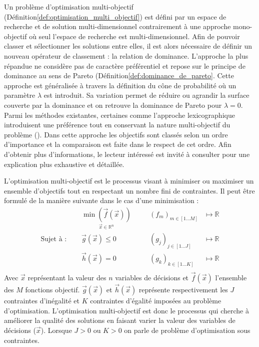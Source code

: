 Un problème d’optimisation multi-objectif (Définition\ref{def:optimisation_multi_objectif})
est défini par un espace de recherche et de solution multi-dimensionnel contrairement à
une approche mono-objectif où seul l’espace de recherche est multi-dimensionnel.
Afin de pouvoir classer et sélectionner les solutions entre elles, il est alors nécessaire
de définir un nouveau opérateur de classement : la relation de dominance.
L’approche la plus répandue ne considère pas de caractère préférentiel et repose sur
le principe de dominance au sens de Pareto (Définition\ref{def:dominance_de_pareto}.
Cette approche est généralisée à travers la définition du cône de probabilité où
un paramètre $\lambda$ est introduit. Sa variation permet de réduire ou agrandir
la surface couverte par la dominance et on retrouve la dominance de Pareto pour $\lambda = 0$.
Parmi les méthodes existantes, certaines comme l’approche lexicographique introduisent une
préférence tout en conservant la nature multi-objectif du problème (). Dans cette approche les objectifs sont classés selon un ordre d’importance et
la comparaison est faite dans le respect de cet ordre.
Afin d’obtenir plus d’informations, le lecteur intéressé est invité à consulter \cite{Collette2002}
pour une explication plus exhaustive et détaillée.

\begin{Def}\label{def:optimisation_multi_objectif}
L’optimisation multi-objectif est le processus visant à minimiser ou maximiser un ensemble
d’objectifs tout en respectant un nombre fini de contraintes.
Il peut être formulé de la manière suivante dans le cas d’une minimisation :
\begin{equation}\label{eq:def_optimisation}
  \begin{aligned}
                           & \underset{\vec{x} \in \mathbb{R}^{n}}{\min(\vec{f}(\vec{x}))}&
                           & \quad (f_{m})_{m \in [1 ... M]} & \longmapsto \mathbb{R} \\
    \text{Sujet à : }\quad & \vec{g}(\vec{x}) \leqslant 0                                 &
                           & \quad (g_{j})_{j \in [1 ... J]} & \longmapsto \mathbb{R} \\
                           & \vec{h}(\vec{x}) = 0                                         &
                           & \quad (g_{k})_{k \in [1 ... K]} & \longmapsto \mathbb{R} \\
  \end{aligned}
\end{equation}
Avec $\vec{x}$ représentant la valeur des $n$ variables de décisions et $\vec{f}(\vec{x})$
l’ensemble des $M$ fonctions objectif.  $\vec{g}(\vec{x})$ et $\vec{h}(\vec{x})$ représente
respectivement les $J$ contraintes d’inégalité et $K$ contraintes d’égalité imposées au problème
d’optimisation. L’optimisation multi-objectif est donc le processus qui cherche à améliorer la
qualité des solutions en faisant varier la valeur des variables de décisions ($\vec{x}$).
Lorsque $J > 0$ ou $K > 0$ on parle de problème d’optimisation sous contraintes.
\end{Def}


